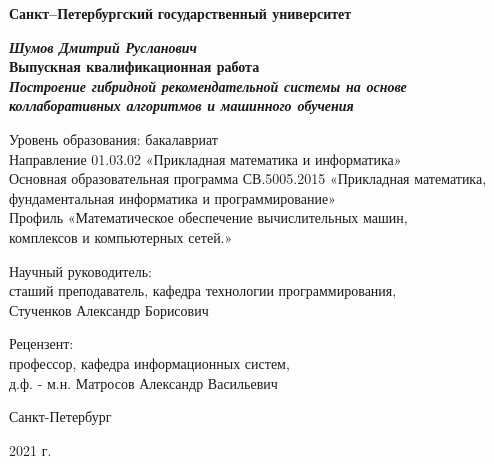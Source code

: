 \begin{titlepage}
\begin{center}

\textbf{Санкт--Петербургский}
\textbf{государственный университет}

\vspace{35mm}

\textbf{\textit{\large Шумов Дмитрий Русланович}} \\[8mm]

\textbf{\large Выпускная квалификационная работа}\\[3mm]
\textbf{\textit{\large Построение гибридной рекомендательной системы на основе коллаборативных алгоритмов и машинного обучения}}

\vspace{20mm}
Уровень образования: бакалавриат\\
Направление 01.03.02 «Прикладная математика и информатика»\\
Основная образовательная программа СВ.5005.2015
«Прикладная математика, фундаментальная информатика и программирование»\\
Профиль «Математическое обеспечение вычислительных машин,\\ комплексов и компьютерных сетей.»\\[30mm]


\begin{flushright}
{Научный руководитель:} \\
сташий преподаватель, кафедра технологии программирования,\\Стученков Александр Борисович
\end{flushright}
\begin{flushright}
{Рецензент:} \\
профессор, кафедра информационных систем,\\д.ф. - м.н.  Матросов Александр Васильевич
\end{flushright}

\vfill 

{Санкт-Петербург}
\par{2021 г.}
\end{center}
\end{titlepage}
\restoregeometry
\addtocounter{page}{1}